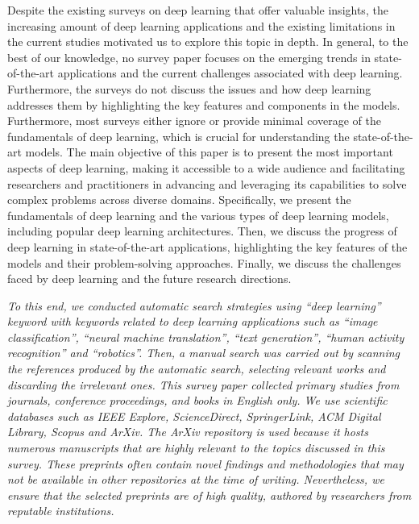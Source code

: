 \documentclass[preprint,12pt]{elsarticle}
\begin{document}
Despite the existing surveys on deep learning that offer valuable insights, the increasing amount of deep learning applications and the existing limitations in the current studies motivated us to explore this topic in depth. In general, to the best of our knowledge, no survey paper focuses on the emerging trends in state-of-the-art applications and the current challenges associated with deep learning. Furthermore, the surveys do not discuss the issues and how deep learning addresses them by highlighting the key features and components in the models. Furthermore, most surveys either ignore or provide minimal coverage of the fundamentals of deep learning, which is crucial for understanding the state-of-the-art models. The main objective of this paper is to present the most important aspects of deep learning, making it accessible to a wide audience and facilitating researchers and practitioners in advancing and leveraging its capabilities to solve complex problems across diverse domains. Specifically, we present the fundamentals of deep learning and the various types of deep learning models, including popular deep learning architectures. Then, we discuss the progress of deep learning in state-of-the-art applications, highlighting the key features of the models and their problem-solving approaches. Finally, we discuss the challenges faced by deep learning and the future research directions.

\emph{To this end, we conducted automatic search strategies using ``deep learning'' keyword with keywords related to deep learning applications such as ``image classification'', ``neural machine translation'', ``text generation'', ``human activity recognition'' and ``robotics''. Then, a manual search was carried out by scanning the references produced by the automatic search, selecting relevant works and discarding the irrelevant ones. This survey paper collected primary
studies from journals, conference proceedings, and books in English only. We use scientific databases such as IEEE Explore, ScienceDirect, SpringerLink, ACM Digital Library, Scopus and ArXiv. The ArXiv repository is used because it hosts numerous manuscripts that are highly relevant to the topics discussed in this survey. These preprints often contain novel findings and methodologies that may not be available in other repositories at the time of writing. Nevertheless, we ensure that the selected preprints are of high quality, authored by researchers from reputable institutions.}
\end{document}

